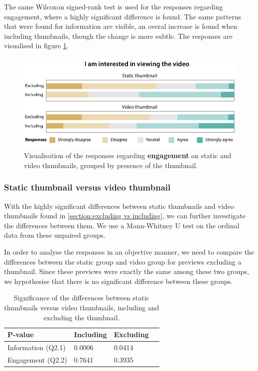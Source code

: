 \documentclass{../resources/sig-alternate-05-2015}
\begin{document}
The same Wilcoxon signed-rank test is used for the responses regarding engagement, where a highly significant difference is found. The same patterns that were found for information are visible, an overal increase is found when including thumbnails, though the change is more subtle. The responses are visualised in figure \ref{figure:engagement including excluding}.

\begin{figure}[h!]
	\includegraphics[width=\linewidth]{resources/engagement_including_excluding}
	\caption{Visualisation of the responses regarding \textbf{engagement} on static and video thumbnails, grouped by presence of the thumbnail.}
	\label{figure:engagement including excluding}
\end{figure}

\subsubsection{Static thumbnail versus video thumbnail}
\label{section: static versus video}

With the highly significant differences between static thumbnails and video thumbnails found in \ref{section:excluding vs including}, we can further investigate the differences between them. We use a Mann-Whitney U test on the ordinal data from these unpaired groups.

In order to analyse the responses in an objective manner, we need to compare the differences between the static group and video group for previews excluding a thumbnail. Since these previews were exactly the same among these two groups, we hypothesise that there is no significant difference between these groups.

\begin{table}[h]
\centering
\caption{Significance of the differences between static thumbnails versus video thumbnails, including and excluding the thumbnail.}
\label{table: q2 significance}
\begin{tabular}{@{}llll@{}}
\textbf{P-value}   & \textbf{Including} & \textbf{Excluding} \\ \hline
Information (Q2.1) & 0.0006             & 0.0414             \\
Engagement (Q2.2)  & 0.7641             & 0.3935
\end{tabular}
\end{table}
\end{document}
